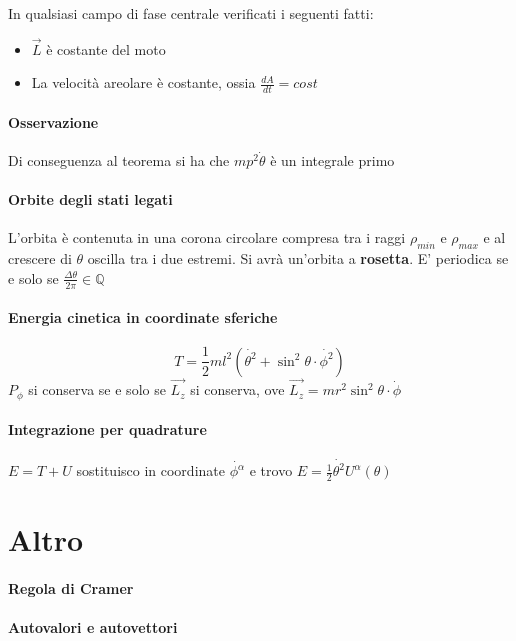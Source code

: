 \documentclass[a4paper,12pt]{article}
\begin{document}
\begin{prop}
In qualsiasi campo di fase centrale verificati i seguenti fatti:
\begin{itemize} 
\item $\vec{L}$ è costante del moto
\item La velocità areolare è costante, ossia $\frac{dA}{dt}=cost$

\end{itemize}
 

\end{prop}
\paragraph{Osservazione} Di conseguenza al teorema si ha che $mp^2\dot{\theta}$ è un integrale primo
\paragraph{Orbite degli stati legati}
L'orbita è contenuta in una corona circolare compresa tra i raggi $\rho_{min}$ e $\rho_{max}$ e al crescere di $\theta$ oscilla tra i due estremi. Si avrà un'orbita a \textbf{ rosetta}. E' periodica se e solo se $\frac{\Delta\theta}{2\pi}\in\mathbb{Q}$
\paragraph{Energia cinetica in coordinate sferiche}
\begin{displaymath}
T=\frac{1}{2}ml^2(\dot{\theta^2}+\sin^2\theta \cdot \dot{\phi^2})
\end{displaymath}
$P_{\phi}$ si conserva se e solo se $\vec{L_z}$ si conserva, ove $\vec{L_z}=mr^2\sin^2\theta\cdot\dot{\phi}$
\paragraph{Integrazione per quadrature}
$E=T+U$ sostituisco in coordinate $\dot{\phi^{\alpha}}$ e trovo $E=\frac{1}{2}\dot{\theta^2}U^{\alpha}(\theta)$

\section{Altro}
\paragraph{Regola di Cramer}
\paragraph{Autovalori e autovettori}
\end{document}
